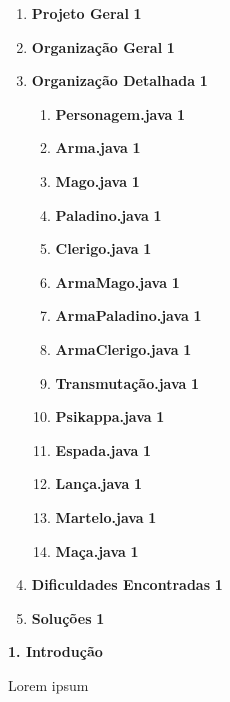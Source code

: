 \documentclass[11pt]{uiobrev}
\begin{document}
\begin{enumerate}
    \item \textbf{Projeto Geral} \dotfill \textbf{1}
    \item \textbf{Organização Geral} \dotfill \textbf{1}
    \item \textbf{Organização Detalhada} \dotfill \textbf{1}
        \begin{enumerate}[label*=\arabic*.] 
            \item \textbf{Personagem.java} \dotfill \textbf{1}
            \item \textbf{Arma.java} \dotfill \textbf{1}
            \item \textbf{Mago.java} \dotfill \textbf{1}
            \item \textbf{Paladino.java} \dotfill \textbf{1}
            \item \textbf{Clerigo.java} \dotfill \textbf{1}
            \item \textbf{ArmaMago.java} \dotfill \textbf{1}
            \item \textbf{ArmaPaladino.java} \dotfill \textbf{1}
            \item \textbf{ArmaClerigo.java} \dotfill \textbf{1}
            \item \textbf{Transmutação.java} \dotfill \textbf{1}
            \item \textbf{Psikappa.java} \dotfill \textbf{1}
            \item \textbf{Espada.java} \dotfill \textbf{1}
            \item \textbf{Lança.java} \dotfill \textbf{1}
            \item \textbf{Martelo.java} \dotfill \textbf{1}
            \item \textbf{Maça.java} \dotfill \textbf{1}
        \end{enumerate}
    \item \textbf{Dificuldades Encontradas} \dotfill \textbf{1}
    \item \textbf{Soluções} \dotfill \textbf{1}
\end{enumerate}
\thispagestyle{empty}

\newpage

\setcounter{page}{1}

\noindent
\Large \textbf{1. Introdução}

Lorem ipsum
\end{document}
